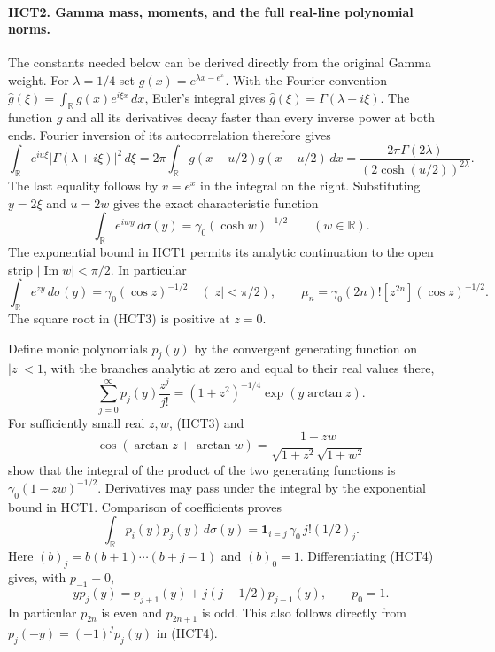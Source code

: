 \paragraph{HCT2. Gamma mass, moments, and the full real-line polynomial norms.}
The constants needed below can be derived directly from the original
Gamma weight. For $\lambda=1/4$ set $g(x)=e^{\lambda x-e^x}$.
With the Fourier convention
$\widehat g(\xi)=\int_{\mathbb R}g(x)e^{i\xi x}\,dx$, Euler's
integral gives $\widehat g(\xi)=\Gamma(\lambda+i\xi)$.
The function $g$ and all its derivatives decay faster than every
inverse power at both ends. Fourier inversion of its autocorrelation
therefore gives
\[
 \int_{\mathbb R}e^{iu\xi}|\Gamma(\lambda+i\xi)|^2\,d\xi
 =2\pi\int_{\mathbb R}g(x+u/2)g(x-u/2)\,dx
 =\frac{2\pi\Gamma(2\lambda)}{(2\cosh(u/2))^{2\lambda}}.
\]
The last equality follows by $v=e^x$ in the integral on the right.
Substituting $y=2\xi$ and $u=2w$ gives the exact characteristic
function
\[
 \int_{\mathbb R}e^{iwy}\,d\sigma(y)
 =\gamma_0(\cosh w)^{-1/2}\qquad(w\in\mathbb R).
\]
The exponential bound in HCT1 permits its analytic continuation
to the open strip $|\operatorname{Im}w|<\pi/2$. In particular
\begin{equation}\tag{HCT3}
 \int_{\mathbb R}e^{zy}\,d\sigma(y)
 =\gamma_0(\cos z)^{-1/2}\quad(|z|<\pi/2),\qquad
 \mu_n=\gamma_0(2n)![z^{2n}](\cos z)^{-1/2}.
\end{equation}
The square root in (HCT3) is positive at $z=0$.

Define monic polynomials $p_j(y)$ by the convergent generating function
on $|z|<1$, with the branches analytic at zero and equal to their
real values there,
\begin{equation}\tag{HCT4}
 \sum_{j=0}^\infty p_j(y)\frac{z^j}{j!}
 =(1+z^2)^{-1/4}\exp(y\arctan z).
\end{equation}
For sufficiently small real $z,w$, (HCT3) and
\[
 \cos(\arctan z+\arctan w)
 =\frac{1-zw}{\sqrt{1+z^2}\sqrt{1+w^2}}
\]
show that the integral of the product of the two generating functions
is $\gamma_0(1-zw)^{-1/2}$. Derivatives may pass under the integral
by the exponential bound in HCT1. Comparison of coefficients proves
\begin{equation}\tag{HCT5}
 \int_{\mathbb R}p_i(y)p_j(y)\,d\sigma(y)
 =\mathbf1_{i=j}\,\gamma_0\,j!(1/2)_j.
\end{equation}
Here $(b)_j=b(b+1)\cdots(b+j-1)$ and $(b)_0=1$.
Differentiating (HCT4) gives, with $p_{-1}=0$,
\begin{equation}\tag{HCT6}
 y p_j(y)=p_{j+1}(y)+j(j-1/2)p_{j-1}(y),\qquad p_0=1.
\end{equation}
In particular $p_{2n}$ is even and $p_{2n+1}$ is odd. This also
follows directly from $p_j(-y)=(-1)^j p_j(y)$ in (HCT4).

